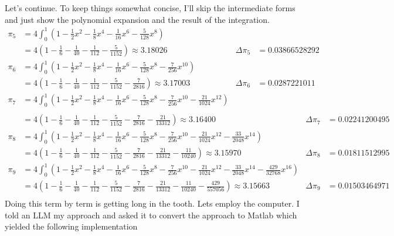 \documentclass[10pt]{article}
\begin{document}
\begin{enumerate}
\begin{enumerate}
            Let's continue. To keep things somewhat concise, I'll skip the intermediate forms and just show the polynomial expansion and the result of the integration.
            \begin{align*}
            \pi_5 &= 4\int_0^1 \left(1 - \frac{1}{2}x^2 - \frac{1}{8}x^4 - \frac{1}{16}x^6 - \frac{5}{128}x^8\right)\\
                  &= 4 \left(1 - \frac{1}{6} - \frac{1}{40} - \frac{1}{112} - \frac{5}{1152}\right) \approx 3.18026 & \Delta \pi_5 &= 0.03866528292\\
            \pi_6 &= 4\int_0^1 \left(1 - \frac{1}{2}x^2 - \frac{1}{8}x^4 - \frac{1}{16}x^6 - \frac{5}{128}x^8 - \frac{7}{256}x^{10}\right)\\
                  &= 4 \left(1 - \frac{1}{6} - \frac{1}{40} - \frac{1}{112} - \frac{5}{1152} - \frac{7}{2816}\right) \approx 3.17003 & \Delta \pi_6 &= 0.0287221011\\
            \pi_7 &= 4\int_0^1 \left(1 - \frac{1}{2}x^2 - \frac{1}{8}x^4 - \frac{1}{16}x^6 - \frac{5}{128}x^8 - \frac{7}{256}x^{10} - \frac{21}{1024}x^{12}\right)\\
        \end{align*}
        \begin{align*}
                  &= 4 \left(1 - \frac{1}{6} - \frac{1}{40} - \frac{1}{112} - \frac{5}{1152} - \frac{7}{2816} - \frac{21}{13312}\right) \approx 3.16400 & \Delta \pi_7 &= 0.02241200495\\
            \pi_8 &= 4\int_0^1 \left(1 - \frac{1}{2}x^2 - \frac{1}{8}x^4 - \frac{1}{16}x^6 - \frac{5}{128}x^8 - \frac{7}{256}x^{10} - \frac{21}{1024}x^{12} - \frac{33}{2048}x^{14}\right)\\
                  &= 4 \left(1 - \frac{1}{6} - \frac{1}{40} - \frac{1}{112} - \frac{5}{1152} - \frac{7}{2816} - \frac{21}{13312} - \frac{11}{10240}\right) \approx 3.15970 & \Delta \pi_8 &= 0.01811512995\\
            \pi_9 &= 4\int_0^1 \left(1 - \frac{1}{2}x^2 - \frac{1}{8}x^4 - \frac{1}{16}x^6 - \frac{5}{128}x^8 - \frac{7}{256}x^{10} - \frac{21}{1024}x^{12} - \frac{33}{2048}x^{14} - \frac{429}{32768}x^{16}\right)\\
                  &= 4 \left(1 - \frac{1}{6} - \frac{1}{40} - \frac{1}{112} - \frac{5}{1152} - \frac{7}{2816} - \frac{21}{13312} - \frac{11}{10240} - \frac{429}{557056} \right) \approx 3.15663 & \Delta \pi_9 &= 0.01503464971\\
            \end{align*}
			Doing this term by term is getting long in the tooth. Lets employ the computer. I told an LLM my approach and asked it to convert the approach to Matlab which yielded the following implementation

\end{enumerate}
\end{enumerate}
\end{document}
